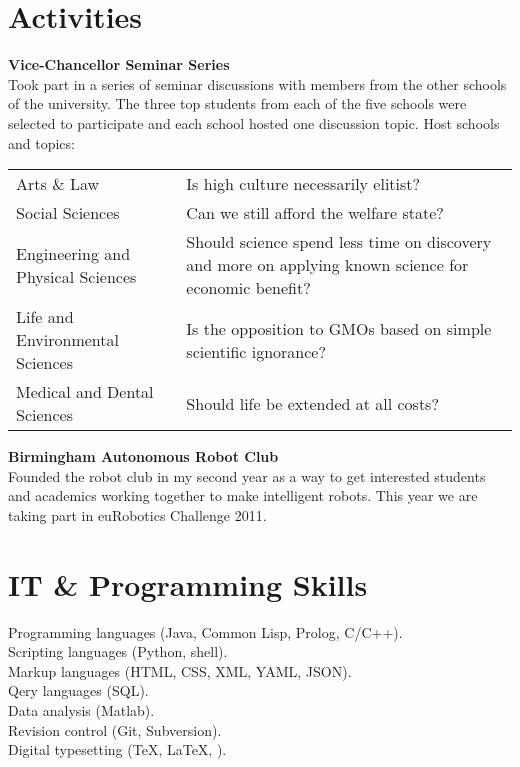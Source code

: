 \documentclass[10pt, a4paper]{article}
\newcommand{\years}[1]{\marginnote{\scriptsize #1}}
\begin{document}
\section*{Activities}
\years{2011--2012}\textbf{Vice-Chancellor Seminar Series}\\[.2cm]
Took part in a series of seminar discussions with members from the
other schools of the university. The three top students from each of
the five schools were selected to participate and each school hosted
one discussion topic. Host schools and topics:\\[.1cm]
\small{
  \begin{tabular}{l p{8cm}}
    \hspace{.5cm}Arts \& Law & Is high culture necessarily elitist?\\
    \hspace{.5cm}Social Sciences & Can we still afford the welfare state?\\
    \hspace{.5cm}Engineering and Physical Sciences & Should science spend less time on discovery and more on applying known science for economic benefit?\\
    \hspace{.5cm}Life and Environmental Sciences & Is the opposition to GMOs based on simple scientific ignorance?\\
    \hspace{.5cm}Medical and Dental Sciences & Should life be extended at all costs?
  \end{tabular}
}
\vspace{.3cm}

\years{2010--2012}\textbf{Birmingham Autonomous Robot Club}\\[.2cm]
Founded the robot club in my second year as a way to get interested
students and academics working together to make intelligent
robots. This year we are taking part in euRobotics Challenge 2011.

\section*{IT \& Programming Skills}
Programming languages (Java, Common Lisp, Prolog, C/C++).\\
Scripting languages (Python, shell).\\
Markup languages (HTML, CSS, XML, YAML, JSON).\\
Qery languages (SQL).\\
Data analysis (Matlab).\\
Revision control (Git, Subversion).\\
Digital typesetting (\TeX, \LaTeX, \XeTeX).
\end{document}
